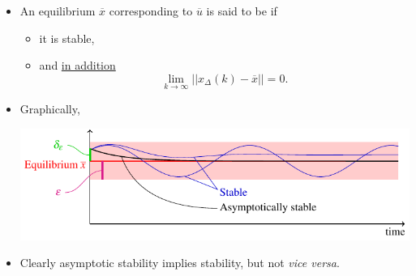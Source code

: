 \begin{frame}
\myPause
\begin{itemize}[<+-| alert@+>]
\item An equilibrium $\overline{x}$ corresponding to $\overline{u}$ is said to be  if
      \begin{itemize}[<+-| alert@+>]
      \item it is stable,
      \item and \underline{in addition}
            \begin{displaymath}
             \lim_{k\rightarrow\infty} ||x_{\Delta}(k)-\overline{x}||=0.
            \end{displaymath}
      \end{itemize}
      \item Graphically,
            \begin{center}
             \includegraphics[width=0.60\columnwidth]{./Unit-02/img/AsympStableEq-general.pdf}
            \end{center}
\item Clearly asymptotic stability implies stability, but not \emph{vice versa}.
\end{itemize}
\end{frame}

